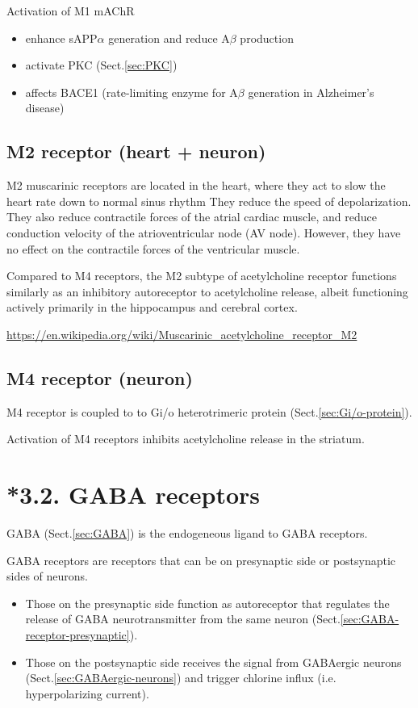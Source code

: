 Activation of M1 mAChR
\begin{itemize}
  \item enhance sAPP$\alpha$ generation and reduce A$\beta$ production
  
  \item activate PKC (Sect.\ref{sec:PKC}) 
  
  \item affects BACE1 (rate-limiting enzyme for A$\beta$ generation in
  Alzheimer's disease)
\end{itemize}

\subsection{M2 receptor (heart + neuron)}
\label{sec:M2-receptor}

M2 muscarinic receptors are located in the heart, where they act to slow the
heart rate down to normal sinus rhythm 
They reduce the speed of depolarization. They also reduce contractile forces of
the atrial cardiac muscle, and reduce conduction velocity of the
atrioventricular node (AV node). However, they have no effect on the contractile
forces of the ventricular muscle.

Compared to M4 receptors, the M2 subtype of acetylcholine receptor functions
similarly as an inhibitory autoreceptor to acetylcholine release, albeit
functioning actively primarily in the hippocampus and cerebral cortex.

\url{https://en.wikipedia.org/wiki/Muscarinic_acetylcholine_receptor_M2}

\subsection{M4 receptor (neuron)}
\label{sec:M4-receptor}

M4 receptor is coupled to to Gi/o heterotrimeric protein
(Sect.\ref{sec:Gi/o-protein}).

Activation of M4 receptors inhibits acetylcholine release in the striatum. 



\section{*3.2. GABA receptors}
\label{sec:GABA_receptors}

GABA (Sect.\ref{sec:GABA}) is the endogeneous ligand to GABA
receptors. 


GABA receptors are receptors that can be on presynaptic side or
postsynaptic sides of neurons. 
\begin{itemize}
  \item Those on the presynaptic side function as autoreceptor
  that regulates the release of GABA neurotransmitter from the same neuron
  (Sect.\ref{sec:GABA-receptor-presynaptic}).
  
  \item  Those on the postsynaptic side receives the signal from GABAergic neurons
(Sect.\ref{sec:GABAergic-neurons}) and trigger chlorine influx (i.e.
hyperpolarizing current).
  
\end{itemize}

